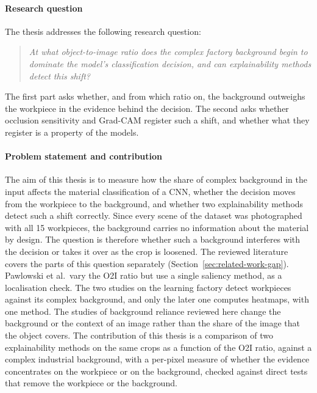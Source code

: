 \paragraph{Research question}
The thesis addresses the following research question:
\begin{quote}
\emph{At what object-to-image ratio does the complex factory background begin to
dominate the model's classification decision, and can explainability methods detect
this shift?}
\end{quote}
The first part asks whether, and from which ratio on, the background outweighs the
workpiece in the evidence behind the decision. The second asks whether occlusion
sensitivity and Grad-CAM register such a shift, and whether what they register is a
property of the models.

\paragraph{Problem statement and contribution}
The aim of this thesis is to measure how the share of complex background in the input
affects the material classification of a CNN, whether the decision moves from the
workpiece to the background, and whether two explainability methods detect such a shift
correctly. Since every scene of the dataset was photographed with all 15 workpieces,
the background carries no information about the material by design. The question is
therefore whether such a background interferes with the decision or takes it over as the
crop is loosened. The
reviewed literature covers the parts of this question separately
(Section~\ref{sec:related-work-gap}). Pawlowski et al.\ vary the O2I ratio but use a
single saliency method, as a localisation check. The two studies on the learning factory
detect workpieces against its complex background, and only the later one computes
heatmaps, with one method. The studies of background reliance reviewed here change the
background or the context of an image rather than the share of the image that the object
covers. The
contribution of this thesis is a comparison of two explainability methods on the same
crops as a function of the O2I ratio, against a complex industrial background, with a
per-pixel measure of whether the evidence concentrates on the workpiece or on the
background, checked against direct tests that remove the workpiece or the background.

